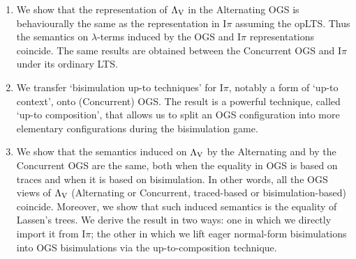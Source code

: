 \documentclass[11pt,a4paper]{amsart}
\theoremstyle{plain}
\theoremstyle{definition}
\theoremstyle{defC}
\theoremstyle{thmC}
\theoremstyle{plain}
\numberwithin{equation}{section}
\newcommand{\opLTS}{opLTS\xspace}  %
\newcommand{\LasV}{\Lambda_{\rm V}} %
\newcommand{\LasN}{\Lambda_{\rm N}} %
\newcommand{\Intp}{\mbox{I$\pi$}\xspace}   %
\newcommand{\piI}{\Intp}   %
\theoremstyle{plain}
\theoremstyle{definition}
\begin{document}
\begin{enumerate}
\item
We show that
the representation of $\LasV$ in the Alternating 
  OGS  is behaviourally the same as the representation in \piI assuming the \opLTS.
Thus the semantics on $\lambda$-terms induced by the OGS and \piI representations
coincide. 
 The same results are obtained between the Concurrent  OGS and \piI under  its ordinary
 LTS. 


\item 
We   transfer 
 `bisimulation up-to techniques' for  $\piI$, notably a form of `up-to context',
 onto  (Concurrent) OGS.
The result is a powerful technique, called `up-to composition', that allows us to split an OGS
configuration into more elementary configurations during the bisimulation game. 


\item
We show that the semantics induced on $\LasV$ by the Alternating 
and by the Concurrent OGS
are the same, both when the equality in OGS is  based  on traces and
when it is based on bisimulation. 
In other words, all the OGS views of $\LasV$
(Alternating or Concurrent, traced-based or bisimulation-based) coincide. 
Moreover,  we show 
that 
 such
induced semantics is the equality of 
Lassen's trees. We derive the result in two ways:
one  in which we  directly import it from \piI; the other
in which we lift eager normal-form bisimulations into  OGS bisimulations via the up-to-composition technique. 



\end{enumerate}
\end{document}
